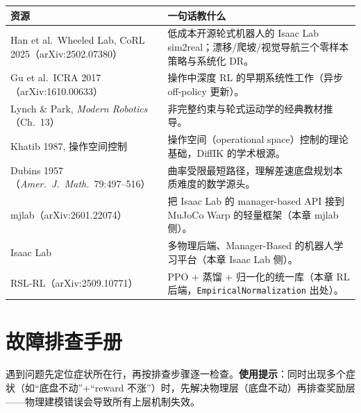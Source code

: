 \begin{center}
\small
\begin{tabular}{@{}p{6.6cm}p{6.4cm}@{}}
\toprule
资源 & 一句话教什么 \\
\midrule
Han et al.\ Wheeled Lab, CoRL 2025（arXiv:2502.07380）\,\cite{han2025wheeledlab} & 低成本开源轮式机器人的 Isaac Lab sim2real；漂移/爬坡/视觉导航三个零样本策略与系统化 DR。 \\
Gu et al.\ ICRA 2017（arXiv:1610.00633）\,\cite{gu2017deeprl} & 操作中深度 RL 的早期系统性工作（异步 off-policy 更新）。 \\
Lynch \& Park, \textit{Modern Robotics}（Ch.\ 13）\,\cite{lynch2017modern} & 非完整约束与轮式运动学的经典教材推导。 \\
Khatib 1987, 操作空间控制\,\cite{khatib1987operational} & 操作空间（operational space）控制的理论基础，DiffIK 的学术根源。 \\
Dubins 1957（\textit{Amer.\ J.\ Math.}\ 79:497--516）\,\cite{dubins1957curves} & 曲率受限最短路径，理解差速底盘规划本质难度的数学源头。 \\
mjlab（arXiv:2601.22074）\,\cite{mjlab2026} & 把 Isaac Lab 的 manager-based API 接到 MuJoCo Warp 的轻量框架（本章 mjlab 侧）。 \\
Isaac Lab\,\cite{mittal2025isaaclab} & 多物理后端、Manager-Based 的机器人学习平台（本章 Isaac Lab 侧）。 \\
RSL-RL（arXiv:2509.10771）\,\cite{schwarke2025rslrl} & PPO + 蒸馏 + 归一化的统一库（本章 RL 后端，\verb|EmpiricalNormalization| 出处）。 \\
\bottomrule
\end{tabular}
\end{center}

\section{故障排查手册}
\label{sec:rlmc-wh-troubleshoot}

遇到问题先定位症状所在行，再按排查步骤逐一检查。\textbf{使用提示}：同时出现多个症状（如“底盘不动”+“reward 不涨”）时，先解决物理层（底盘不动）再排查奖励层——物理建模错误会导致所有上层机制失效。


